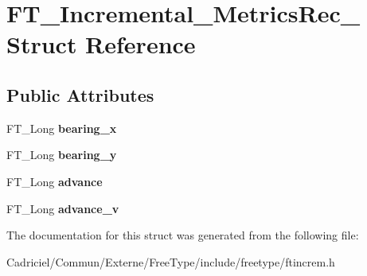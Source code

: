 \hypertarget{struct_f_t___incremental___metrics_rec__}{}\section{F\+T\+\_\+\+Incremental\+\_\+\+Metrics\+Rec\+\_\+ Struct Reference}
\label{struct_f_t___incremental___metrics_rec__}
\subsection*{Public Attributes}
\begin{DoxyCompactItemize}
\item 
F\+T\+\_\+\+Long {\bfseries bearing\+\_\+x}\hypertarget{struct_f_t___incremental___metrics_rec___af065d998d0a0f2a57513125038d802a6}{}\label{struct_f_t___incremental___metrics_rec___af065d998d0a0f2a57513125038d802a6}

\item 
F\+T\+\_\+\+Long {\bfseries bearing\+\_\+y}\hypertarget{struct_f_t___incremental___metrics_rec___af1443aa7c1ca54d3c2a29f1cf6d7848b}{}\label{struct_f_t___incremental___metrics_rec___af1443aa7c1ca54d3c2a29f1cf6d7848b}

\item 
F\+T\+\_\+\+Long {\bfseries advance}\hypertarget{struct_f_t___incremental___metrics_rec___a996c99aa0e6b36c2c7776fc1a2b6b614}{}\label{struct_f_t___incremental___metrics_rec___a996c99aa0e6b36c2c7776fc1a2b6b614}

\item 
F\+T\+\_\+\+Long {\bfseries advance\+\_\+v}\hypertarget{struct_f_t___incremental___metrics_rec___a0ee280662a03ea935dbfe377e56f4d6d}{}\label{struct_f_t___incremental___metrics_rec___a0ee280662a03ea935dbfe377e56f4d6d}

\end{DoxyCompactItemize}


The documentation for this struct was generated from the following file\+:\begin{DoxyCompactItemize}
\item 
Cadriciel/\+Commun/\+Externe/\+Free\+Type/include/freetype/ftincrem.\+h\end{DoxyCompactItemize}
